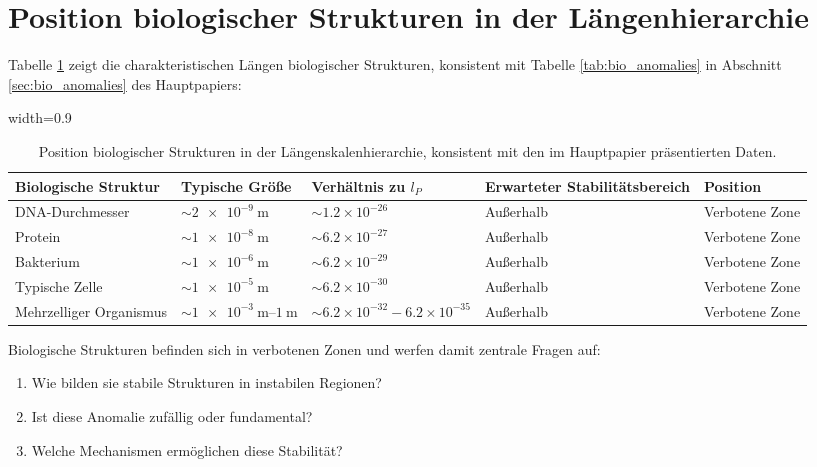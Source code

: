 \documentclass[12pt,a4paper]{article}
\newcommand{\tablescale}{0.9}
\begin{document}
	\section{Position biologischer Strukturen in der Längenhierarchie}
	\label{sec:bio_anomalies_detail}
	
	Tabelle \ref{tab:bio_structures} zeigt die charakteristischen Längen biologischer Strukturen, konsistent mit Tabelle \ref{tab:bio_anomalies} in Abschnitt \ref{sec:bio_anomalies} des Hauptpapiers:
	
	\begin{table}[H]
		\centering
		\begin{adjustbox}{width=\tablescale\textwidth}
			\begin{tabular}{lllll}
				\toprule
				\textbf{Biologische Struktur} & \textbf{Typische Größe} & \textbf{Verhältnis zu $l_P$} & \textbf{Erwarteter Stabilitätsbereich} & \textbf{Position} \\
				\midrule
				DNA-Durchmesser & $\sim \SI{2e-9}{\meter}$ & $\sim 1.2 \times 10^{-26}$ & Außerhalb & Verbotene Zone \\
				Protein & $\sim \SI{1e-8}{\meter}$ & $\sim 6.2 \times 10^{-27}$ & Außerhalb & Verbotene Zone \\
				Bakterium & $\sim \SI{1e-6}{\meter}$ & $\sim 6.2 \times 10^{-29}$ & Außerhalb & Verbotene Zone \\
				Typische Zelle & $\sim \SI{1e-5}{\meter}$ & $\sim 6.2 \times 10^{-30}$ & Außerhalb & Verbotene Zone \\
				Mehrzelliger Organismus & $\sim \SIrange{1e-3}{1}{\meter}$ & $\sim 6.2 \times 10^{-32} - 6.2 \times 10^{-35}$ & Außerhalb & Verbotene Zone \\
				\bottomrule
			\end{tabular}
		\end{adjustbox}
		\caption{Position biologischer Strukturen in der Längenskalenhierarchie, konsistent mit den im Hauptpapier präsentierten Daten.}
		\label{tab:bio_structures}
	\end{table}
	
	Biologische Strukturen befinden sich in verbotenen Zonen und werfen damit zentrale Fragen auf:
	\begin{enumerate}
		\item Wie bilden sie stabile Strukturen in instabilen Regionen?
		\item Ist diese Anomalie zufällig oder fundamental?
		\item Welche Mechanismen ermöglichen diese Stabilität?
	\end{enumerate}
	
\end{document}
